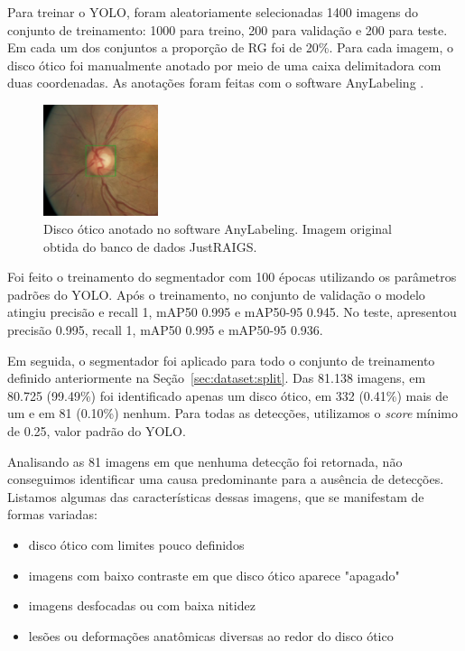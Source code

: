 \documentclass[12pt]{article}
\begin{document}
Para treinar o YOLO, foram aleatoriamente selecionadas 1400 imagens do conjunto de treinamento: 1000 para treino, 200 para validação e 200 para teste. Em cada um dos conjuntos a proporção de RG foi de 20\%. Para cada imagem, o disco ótico foi manualmente anotado por meio de uma caixa delimitadora com duas coordenadas. As anotações foram feitas com o software AnyLabeling \cite{anylabeling}.

\begin{figure}[htb]
 \centering
 \includegraphics[width=0.3\textwidth]{images/disk_labeling.png}
 \caption{Disco ótico anotado no software AnyLabeling. Imagem original obtida do banco de dados JustRAIGS.}
 \label{fig:disk_labeling}
\end{figure}

Foi feito o treinamento do segmentador com 100 épocas utilizando os parâmetros padrões do YOLO. Após o treinamento, no conjunto de validação o modelo atingiu precisão e recall 1, mAP50 0.995 e mAP50-95 0.945. No teste, apresentou precisão 0.995, recall 1, mAP50 0.995 e mAP50-95 0.936.

Em seguida, o segmentador foi aplicado para todo o conjunto de treinamento definido anteriormente na Seção~\ref{sec:dataset:split}. Das 81.138 imagens, em 80.725 (99.49\%) foi identificado apenas um disco ótico, em 332 (0.41\%) mais de um e em 81 (0.10\%) nenhum. Para todas as detecções, utilizamos o \emph{score} mínimo de 0.25, valor padrão do YOLO.

Analisando as 81 imagens em que nenhuma detecção foi retornada, não conseguimos identificar uma causa predominante para a ausência de detecções. Listamos algumas das características dessas imagens, que se manifestam de formas variadas:

\begin{itemize}
    \item disco ótico com limites pouco definidos
    \item imagens com baixo contraste em que disco ótico aparece "apagado"
    \item imagens desfocadas ou com baixa nitidez
    \item lesões ou deformações anatômicas diversas ao redor do disco ótico
\end{itemize}
\end{document}
